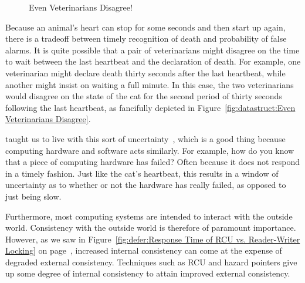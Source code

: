 \begin{figure}[tb]
\centering
{}
\caption{Even Veterinarians Disagree!}
\end{figure}

Because an animal's heart can stop for some seconds and then start up
again, there is a tradeoff between timely recognition of death and
probability of false alarms.
It is quite possible that a pair of veterinarians might disagree on
the time to wait between the last heartbeat and the declaration of
death.
For example, one veterinarian might declare death thirty seconds after
the last heartbeat, while another might insist on waiting a full
minute.
In this case, the two veterinarians would disagree on the state of the
cat for the second period of thirty seconds following the last heartbeat,
as fancifully depicted in
Figure~\ref{fig:datastruct:Even Veterinarians Disagree}.

 taught us to live with this sort of
uncertainty~\cite{WeinerHeisenberg1927Uncertain}, which is a good
thing because computing hardware and software acts similarly.
For example, how do you know that a piece of computing hardware
has failed?
Often because it does not respond in a timely fashion.
Just like the cat's heartbeat, this results in a window of
uncertainty as to whether or not the hardware has really failed,
as opposed to just being slow.

Furthermore, most computing systems are intended to interact with
the outside world.
Consistency with the outside world is therefore of paramount importance.
However, as we saw in
Figure~\ref{fig:defer:Response Time of RCU vs. Reader-Writer Locking}
on
page~\pageref{fig:defer:Response Time of RCU vs. Reader-Writer Locking},
increased internal consistency can come at the expense of degraded
external consistency.
Techniques such as RCU and hazard pointers give up some degree of
internal consistency to attain improved external consistency.

